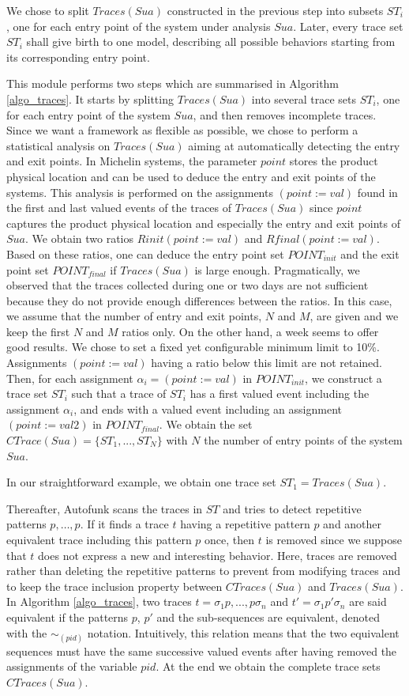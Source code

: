 We chose to split $Traces(Sua)$ constructed in the previous step
into subsets $ST_i$, one for each entry point of the system under
analysis $Sua$. Later, every trace set $ST_i$ shall give birth to
one model, describing all possible behaviors starting from its
corresponding entry point.

This module performs two steps which are summarised in Algorithm
\ref{algo_traces}. It starts by splitting $Traces(Sua)$ into
several trace sets $ST_i$, one for each entry point of the system
$Sua$, and then removes incomplete traces. Since we want a
framework as flexible as possible, we chose to perform a
statistical analysis on $Traces(Sua)$ aiming at automatically
detecting the entry and exit points.
In Michelin systems, the parameter $point$ stores the product
physical location and can be used to deduce the entry and exit
points of the systems.
This analysis is performed on the assignments $(point:=val)$
found in the first and last valued events of the traces of
$Traces(Sua)$ since $point$ captures the product physical
location and especially the entry and exit points of $Sua$.
We obtain two ratios $Rinit(point:=val)$ and
$Rfinal(point:=val)$.  Based on these ratios, one can deduce the
entry point set $POINT_{init}$ and the exit point set
$POINT_{final}$ if $Traces(Sua)$ is large enough. Pragmatically,
we observed that the traces collected during one or two days are
not sufficient because they do not provide enough differences
between the ratios. In this case, we assume that the number of
entry and exit points, $N$ and $M$, are given and we keep the
first $N$ and $M$ ratios only. On the other hand, a week seems to
offer good results. We chose to set a fixed yet configurable
minimum limit to 10\%. Assignments $(point:=val)$ having a ratio
below this limit are not retained. Then, for each assignment
$\alpha_i=(point:=val)$ in $POINT_{init}$, we construct a trace
set $ST_i$ such that a trace of $ST_i$ has a first valued event
including the assignment $\alpha_i$, and ends with a valued event
including an assignment $(point:=val2)$ in $POINT_{final}$. We
obtain the set $CTrace(Sua)=\{ST_1,...,ST_N\}$ with $N$ the
number of entry points of the system $Sua$.

In our straightforward example, we obtain one trace set
$ST_1=Traces(Sua)$.

Thereafter, Autofunk scans the traces in $ST$ and tries
to detect repetitive patterns $p,\dots,p$. If it finds a trace $t$
having a repetitive pattern $p$ and another equivalent trace
including this pattern $p$ once, then $t$ is removed since we
suppose that $t$ does not express a new and interesting
behavior. Here, traces are removed rather than deleting the
repetitive patterns to prevent from modifying traces and to keep
the trace inclusion property between $CTraces(Sua)$ and
$Traces(Sua)$.
In Algorithm \ref{algo_traces}, two traces $t=\sigma_1 p,...,p
\sigma_n$ and $t'=\sigma_1 p' \sigma_n$ are said equivalent if
the patterns $p$, $p'$ and the sub-sequences are equivalent,
denoted with the $\sim_{(pid)}$ notation. Intuitively, this
relation means that the two equivalent sequences must have the
same successive valued events after having removed the
assignments of the variable $pid$. At the end we obtain the complete
trace sets $CTraces(Sua)$.

